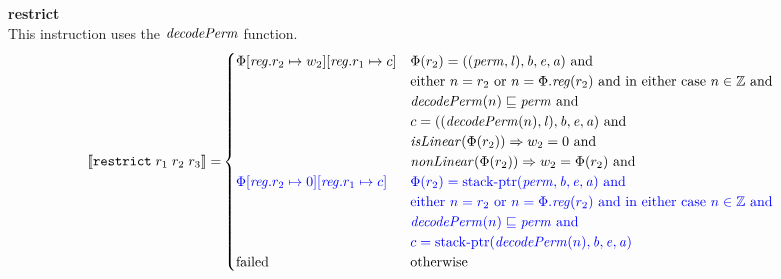 \documentclass[a4paper]{article}
\newcommand{\sem}[1]{\left\llbracket #1 \right\rrbracket}
\newcommand{\tand}{\text{ and }}
\newcommand{\totherwise}{\text{otherwise }}
\newcommand{\sourcecolor}[1]{\color{blue}}
\newcommand{\src}[1]{{\sourcecolor{} #1}}
\newcommand{\targetcolor}[1]{\color{black}}
\newcommand{\trg}[1]{{\targetcolor{} #1}}
\newcommand{\zinstr}[1]{\texttt{#1}}
\newcommand{\threeinstr}[4]{
  \ifthenelse{\equal{#2#3#4}{}}
  {\zinstr{#1}}
  {\zinstr{#1} \; #2 \; #3 \; #4}
}
\newcommand{\trestrict}[3]{\threeinstr{\trg{restrict}}{#1}{#2}{#3}}
\newcommand{\ints}{\mathbb{Z}}
\newcommand{\update}[2]{[#1 \mapsto #2]}
\newcommand{\updReg}[2]{\update{\reg.#1}{#2}}
\newcommand{\perm}{\var{perm}}
\newcommand{\lin}{\var{l}}
\newcommand{\stkptr}[1]{\mathrm{stack\text{-}ptr}(#1)}
\newcommand{\failed}{\mathrm{failed}}
\newcommand{\var}[1]{\mathit{#1}}
\newcommand{\reg}{\var{reg}}
\newcommand{\baddr}{\var{b}}
\newcommand{\eaddr}{\var{e}}
\newcommand{\aaddr}{\var{a}}
\newcommand{\plainfun}[2]{
  \ifthenelse{\equal{#2}{}}
  {\mathit{#1}}
  {\mathit{#1}(#2)}
}
\newcommand{\decPerm}[1]{\plainfun{decodePerm}{#1}}
\newcommand{\nonLinear}[1]{\plainfun{nonLinear}{#1}}
\newcommand{\isLinear}[1]{\plainfun{isLinear}{#1}}
\begin{document}
\noindent\textbf{restrict}\\
This instruction uses the $\decPerm{}$ function.
\begin{align*}
  \sem{\trestrict{r_1}{r_2}{r_3}} = &
                                      \begin{cases}
                                        \Phi\updReg{r_2}{w_2}\updReg{r_1}{c} &
                                        \arraycolsep=0pt
                                        \begin{array}[t]{l}
                                          \Phi(r_2) = ((\perm,\lin),\baddr,\eaddr,\aaddr) \tand \\
                                          \text{either $n = r_2$ or $n = \Phi.\reg(r_2)$ and in either case $n \in \ints$ and} \\
                                          \decPerm{n} \sqsubseteq \perm \tand \\
                                          c = ((\decPerm{n},\lin),\baddr,\eaddr,\aaddr) \tand \\
                                          \isLinear{\Phi(r_2)} \Rightarrow w_2 = 0 \tand \\
                                          \nonLinear{\Phi(r_2)} \Rightarrow w_2 = \Phi(r_2) \tand \\
                                        \end{array}
                                        \\
                                        \src{\Phi\updReg{r_2}{0}\updReg{r_1}{c}} &
                                        \arraycolsep=0pt
                                        \begin{array}[t]{l}
                                          \src{\Phi(r_2) = \stkptr{\perm,\baddr,\eaddr,\aaddr} \tand} \\
                                          \src{\text{either $n = r_2$ or $n = \Phi.\reg(r_2)$ and in either case $n \in \ints$ and}} \\
                                          \src{\decPerm{n} \sqsubseteq \perm \tand} \\
                                          \src{c = \stkptr{\decPerm{n},\baddr,\eaddr,\aaddr}}
                                        \end{array}
                                        \\
                                        \failed & \totherwise
                                      \end{cases}
\end{align*}
\end{document}
